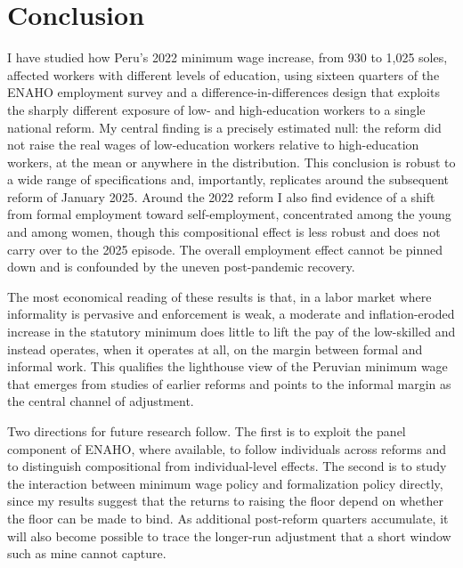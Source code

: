\section{Conclusion}\label{sec:conclusion}

I have studied how Peru's 2022 minimum wage increase, from 930 to 1,025 soles, affected
workers with different levels of education, using sixteen quarters of the ENAHO employment
survey and a difference-in-differences design that exploits the sharply different exposure
of low- and high-education workers to a single national reform. My central finding is a
precisely estimated null: the reform did not raise the real wages of low-education workers
relative to high-education workers, at the mean or anywhere in the distribution. This
conclusion is robust to a wide range of specifications and, importantly, replicates around
the subsequent reform of January 2025. Around the 2022 reform I also find evidence of a
shift from formal employment toward self-employment, concentrated among the young and among
women, though this compositional effect is less robust and does not carry over to the 2025
episode. The overall employment effect cannot be pinned down and is confounded by the
uneven post-pandemic recovery.

The most economical reading of these results is that, in a labor market where informality is
pervasive and enforcement is weak, a moderate and inflation-eroded increase in the statutory
minimum does little to lift the pay of the low-skilled and instead operates, when it
operates at all, on the margin between formal and informal work. This qualifies the
lighthouse view of the Peruvian minimum wage that emerges from studies of earlier reforms
and points to the informal margin as the central channel of adjustment.

Two directions for future research follow. The first is to exploit the panel component of
ENAHO, where available, to follow individuals across reforms and to distinguish
compositional from individual-level effects. The second is to study the interaction between
minimum wage policy and formalization policy directly, since my results suggest that the
returns to raising the floor depend on whether the floor can be made to bind. As additional
post-reform quarters accumulate, it will also become possible to trace the longer-run
adjustment that a short window such as mine cannot capture.
